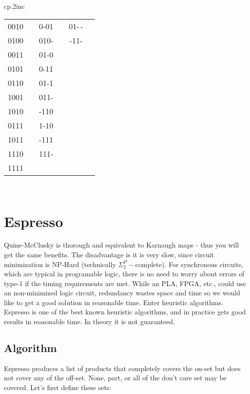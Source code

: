 \begin{tabular}{cp{.2in}c}
\begin{tabular}{cp{.1in}cp{.1in}cp{.1in}}
\textcolor[rgb]{0.00,0.00,1.00}{0010} &  & 0-01 & \checkmark & 01-$\,$- &  \\
0100 & \checkmark & 010- & \checkmark & -11- &  \\\cline{1-2}
0011 & \checkmark & 01-0 & \checkmark &  &  \\\cline{3-4}
0101 & \checkmark & 0-11 & \checkmark &      &  \\
0110 & \checkmark & 01-1 & \checkmark &      &  \\
\textcolor[rgb]{0.00,0.00,1.00}{1001} &  & 011- & \checkmark &  &  \\
1010 & \checkmark & -110 & \checkmark &  &  \\\cline{1-2}
0111 & \checkmark & 1-10 &            &  &  \\\cline{3-4}
\textcolor[rgb]{0.00,0.00,1.00}{1011} &  & -111 & \checkmark &  &  \\
1110     & \checkmark & 111- & \checkmark &  &  \\\cline{1-2}
1111     & \checkmark &      &            &  &  \\
\end{tabular}\\
\end{tabular}

\section{Espresso}

Quine-McClusky is thorough and equivalent to Karnaugh maps - thus you will get the same benefits.  The disadvantage is it is very slow, since circuit minimization is NP-Hard (technically $\Sigma_2^P-$complete).  For synchronous circuits, which are typical in programable logic, there is no need to worry about errors of type-1 if the timing requirements are met.  While an PLA, FPGA, etc., could use an non-minimized logic circuit, redundancy wastes space and time so we would like to get a good solution in reasonable time.  Enter heuristic algorithms.  Espresso is one of the best known heuristic algorithms, and in practice gets good results in reasonable time.  In theory it is not guaranteed.

\subsection{Algorithm}
Espresso produces a list of products that completely covers the on-set but does not cover any of the off-set.  None, part, or all of the don't care set may be covered.  Let's first define these sets:

